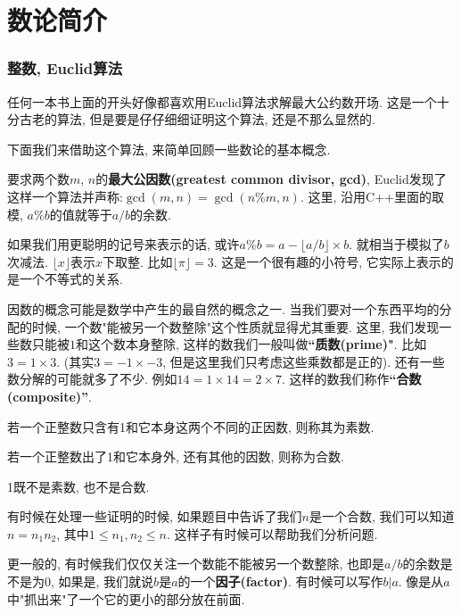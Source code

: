 \part{数论简介}

\section{整数, Euclid算法}

任何一本书上面的开头好像都喜欢用Euclid算法求解最大公约数开场. 
这是一个十分古老的算法, 但是要是仔仔细细证明这个算法, 还是不那么显然的. 

下面我们来借助这个算法, 来简单回顾一些数论的基本概念. 

要求两个数$m$, $n$的\textbf{最大公因数(greatest common divisor, gcd)}, 
Euclid发现了这样一个算法并声称:$\gcd(m, n) = \gcd(n\%m, n)$. 
这里, 沿用C++里面的取模, $a\%b$的值就等于$a/ b$的余数. 

如果我们用更聪明的记号来表示的话, 或许$a\%b=a-\lfloor a/b\rfloor\times b$. 
就相当于模拟了$b$次减法. $\lfloor x\rfloor$表示$x$下取整. 比如$\lfloor \pi\rfloor=3$. 
这是一个很有趣的小符号, 它实际上表示的是一个不等式的关系. 

因数的概念可能是数学中产生的最自然的概念之一. 
当我们要对一个东西平均的分配的时候, 一个数"能被另一个数整除"这个性质就显得尤其重要. 
 这里, 我们发现一些数只能被$1$和这个数本身整除, 
这样的数我们一般叫做\textbf{``质数(prime)"}. 比如$3=1\times3$. 
(其实$3=-1\times -3$, 但是这里我们只考虑这些乘数都是正的). 
还有一些数分解的可能就多了不少. 例如$14=1\times 14 = 2\times 7$. 
这样的数我们称作\textbf{``合数(composite)''}.

\begin{definition}[质数与合数]
    若一个正整数只含有1和它本身这两个不同的正因数, 则称其为素数. 

    若一个正整数出了1和它本身外, 还有其他的因数, 则称为合数.

    1既不是素数, 也不是合数. 
\end{definition}

有时候在处理一些证明的时候, 如果题目中告诉了我们$n$是一个合数, 我们可以知道$n=n_1n_2$, 
其中$1\leq n_1, n_2\leq n$. 这样子有时候可以帮助我们分析问题. 



更一般的, 有时候我们仅仅关注一个数能不能被另一个数整除,
也即是$a/ b$的余数是不是为0, 如果是, 
我们就说$b$是$a$的一个\textbf{因子(factor)}. 
有时候可以写作$b|a$. 像是从$a$中"抓出来"了一个它的更小的部分放在前面. 


